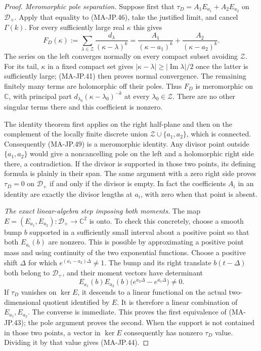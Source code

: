 \begin{proof}
\emph{Meromorphic pole separation.}
Suppose first that
$\tau_D=A_1E_{a_1}+A_2E_{a_2}$ on $\mathcal D_+$.
Apply that equality to (MA-JP.46), take the justified
limit, and cancel $\Gamma(k)$.  For every sufficiently
large real $\kappa$ this gives
\[
 F_D(\kappa):=
    \sum_{\lambda\in\mathcal Z}
                     \frac{d_\lambda}{(\kappa-\lambda)^k}
      =\frac{A_1}{(\kappa-a_1)^k}
             +\frac{A_2}{(\kappa-a_2)^k}.
 \tag{MA-JP.49}
\]
The series on the left converges normally on every
compact subset avoiding $\mathcal Z$.
For its tail, $\kappa$ in a fixed compact set gives
$|\kappa-\lambda|\ge |\operatorname{Im}\lambda|/2$
once the latter is sufficiently large; (MA-JP.41)
then proves normal convergence.  The remaining
finitely many terms are holomorphic off their poles.
Thus $F_D$ is meromorphic on $\mathbb C$, with
principal part
$d_{\lambda_0}(\kappa-\lambda_0)^{-k}$ at every
$\lambda_0\in\mathcal Z$.
There are no other singular terms there and this
coefficient is nonzero.

The identity theorem first applies on the right
half-plane and then on the complement of the locally
finite discrete union
$\mathcal Z\cup\{a_1,a_2\}$, which is connected.
Consequently (MA-JP.49) is a meromorphic identity.
Any divisor point outside $\{a_1,a_2\}$ would give
a noncancelling pole on the left and a holomorphic
right side there, a contradiction.
If the divisor is supported in those two points,
its defining formula is plainly in their span.
The same argument with a zero right side proves
$\tau_D=0$ on $\mathcal D_+$ if and only if the
divisor is empty.  In fact the coefficients $A_i$
in an identity are exactly the divisor lengths
at $a_i$, with zero when that point is absent.

\emph{The exact linear-algebra step imposing both moments.}
The map
$E=(E_{a_1},E_{a_2}):\mathcal D_+\to\mathbb C^2$
is onto.  To check this concretely, choose a smooth
bump $b$ supported in a sufficiently small interval
about a positive point so that both $E_{a_i}(b)$
are nonzero.  This is possible by approximating
a positive point mass and using continuity of
the two exponential functions.
Choose a positive shift $\Delta$ for which
$e^{(a_1-a_2)\Delta}\ne1$.
The bump and its right translate $b(t-\Delta)$
both belong to $\mathcal D_+$, and their moment
vectors have determinant
\[
 E_{a_1}(b)E_{a_2}(b)
          \bigl(e^{a_2\Delta}-e^{a_1\Delta}\bigr)\ne0.
 \tag{MA-JP.50}
\]
If $\tau_D$ vanishes on $\ker E$, it descends to a
linear functional on the actual two-dimensional
quotient identified by $E$.  It is therefore a
linear combination of $E_{a_1},E_{a_2}$.
The converse is immediate.  This proves the first
equivalence of (MA-JP.43); the pole argument proves
the second.
When the support is not contained in those two
points, a vector in $\ker E$ consequently has
nonzero $\tau_D$ value.  Dividing it by that value
gives (MA-JP.44).
\end{proof}

